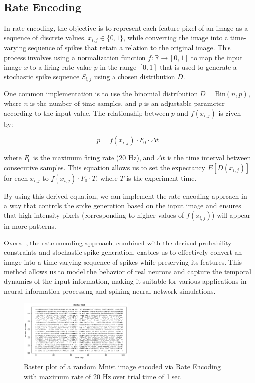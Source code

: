 \subsection{Rate Encoding}

In rate encoding, the objective is to represent each feature pixel of an image as a sequence of discrete values, \(x_{i,j} \in \{0, 1\}\), while converting the image into a time-varying sequence of spikes that retain a relation to the original image. This process involves using a normalization function \(f: \mathbb{R} \rightarrow [0, 1]\) to map the input image \(x\) to a firing rate value \(p\) in the range \([0, 1]\) that is used to generate a stochastic spike sequence \(S_{i,j}\) using a chosen distribution \(D\).

One common implementation is to use the binomial distribution \(D = \text{Bin}(n, p)\), where \(n\) is the number of time samples, and \(p\) is an adjustable parameter according to the input value. The relationship between \(p\) and \(f(x_{i,j})\) is given by:

\begin{equation}
    p = f(x_{i,j}) \cdot F_0 \cdot \Delta t 
\end{equation}

where \(F_0\) is the maximum firing rate (20 Hz), and \(\Delta t\) is the time interval between consecutive samples. This equation allows us to set the expectancy \(E[D(x_{i,j})]\) for each \(x_{i,j}\) to \(f(x_{i,j}) \cdot F_0 \cdot T\), where \(T\) is the experiment time.

By using this derived equation, we can implement the rate encoding approach in a way that controls the spike generation based on the input image and ensures that high-intensity pixels (corresponding to higher values of \(f(x_{i,j})\)) will appear in more patterns.

Overall, the rate encoding approach, combined with the derived probability constraints and stochastic spike generation, enables us to effectively convert an image into a time-varying sequence of spikes while preserving its features. This method allows us to model the behavior of real neurons and capture the temporal dynamics of the input information, making it suitable for various applications in neural information processing and spiking neural network simulations.

\begin{figure}[H]
    \centering
    \includegraphics[width=0.5\textwidth]{methods/spike-encoding/graphs/rate-encoding-raster.png}
    \caption{Raster plot of a random Mnist image encoded via Rate Encoding with maximum rate of 20 Hz over trial time of 1 sec}
    \label{fig:rate-encoding-raster}
\end{figure}
